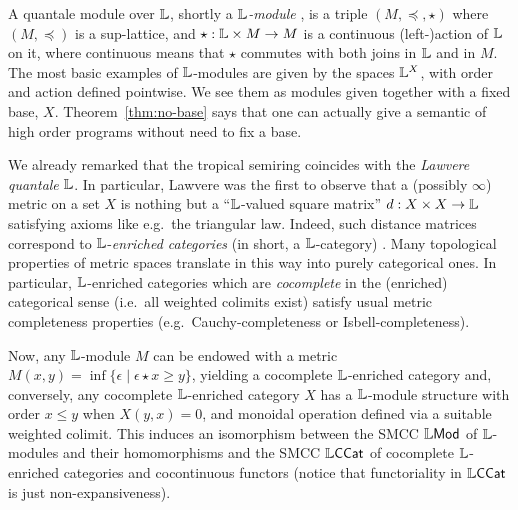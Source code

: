 \documentclass[submission,%
]{eptcs}
\begin{document}
A quantale module over $\mathbb{L}$, shortly a \emph{$\mathbb{L}$-module}%
, is a triple  $(M,\preceq, \star)$ where $(M, \preceq)$ is a sup-lattice, and $\star: \mathbb{L} \times M \to M$ is a continuous (left-)action of $\mathbb{L}$ on it, where continuous means that $\star$ commutes with both joins in $\mathbb{L}$ and in $M$. 
The most basic examples of $\mathbb{L}$-modules are given by the spaces $\mathbb{L}^{X}$, with order and action defined pointwise.
We see them as modules given together with a fixed base, $X$.
Theorem~\ref{thm:no-base} says that one can actually give a semantic of high order programs without need to fix a base.



We already remarked that the tropical semiring coincides with the \emph{Lawvere quantale} $\mathbb{L}$.
In particular, Lawvere was the first to observe that a (possibly $\infty$) metric on a set $X$ is nothing but a ``$\mathbb{L}$-valued square matrix'' $d:X\times X\to \mathbb{L}$ satisfying axioms like e.g.~the triangular law.
Indeed, such distance matrices correspond to $\mathbb{L}$-\emph{enriched categories} (in short, a $\mathbb{L}$-category) \cite{Lawvere1973, Hofmann2014, Stubbe2014}.
Many topological properties of metric spaces translate in this way into purely categorical ones. In particular, $\mathbb{L}$-enriched categories which are \emph{cocomplete} in the (enriched) categorical sense (i.e.~all weighted colimits exist) satisfy usual metric completeness properties (e.g.~Cauchy-completeness or Isbell-completeness). 

Now, any $\mathbb{L}$-module $M$ can be endowed with a metric 
$M(x,y)=\inf\{\epsilon \mid \epsilon \star x \geq y\}$, yielding a cocomplete $\mathbb{L}$-enriched category and, conversely, any cocomplete $\mathbb{L}$-enriched category $X$ has a $\mathbb{L}$-module structure with order $x\leq y$ when $X(y,x)=0$, and monoidal operation defined via a suitable weighted colimit.
This induces an isomorphism between the SMCC $\mathbb{L}\mathsf{Mod}$ of $\mathbb{L}$-modules and their homomorphisms and the SMCC $\mathbb{L}\mathsf{CCat}$ of cocomplete $\mathbb{L}$-enriched categories and cocontinuous functors (notice that functoriality in $\mathbb{L}\mathsf{CCat}$ is just non-expansiveness). 


%
%
\end{document}
